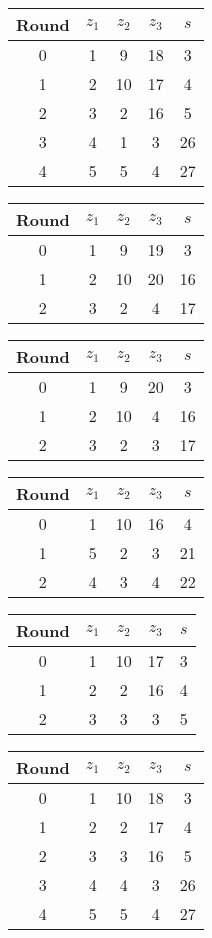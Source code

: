 \begin{multicols}{2}
\begin{tabular}{c | c | c | c | c }
Round & $z_1$ & $z_2$ & $z_3$ & $s$ \\
\hline
0 & 1 & 9 & 18 & 3 \\
1 & 2 & 10 & 17 & 4 \\
2 & 3 & 2 & 16 & 5 \\
3 & 4 & 1 & 3 & 26 \\
4 & 5 & 5 & 4 & 27
\end{tabular}


\begin{tabular}{c | c | c | c | c }
Round & $z_1$ & $z_2$ & $z_3$ & $s$ \\
\hline
0 & 1 & 9 & 19 & 3 \\
1 & 2 & 10 & 20 & 16 \\
2 & 3 & 2 & 4 & 17
\end{tabular}


\begin{tabular}{c | c | c | c | c }
Round & $z_1$ & $z_2$ & $z_3$ & $s$ \\
\hline
0 & 1 & 9 & 20 & 3 \\
1 & 2 & 10 & 4 & 16 \\
2 & 3 & 2 & 3 & 17
\end{tabular}

\begin{tabular}{c | c | c | c | c }
Round & $z_1$ & $z_2$ & $z_3$ & $s$ \\
\hline
0 & 1 & 10 & 16 & 4 \\
1 & 5 & 2 & 3 & 21 \\
2 & 4 & 3 & 4 & 22
\end{tabular}

\begin{tabular}{c | c | c | c | c }
Round & $z_1$ & $z_2$ & $z_3$ & $s$ \\
\hline
0 & 1 & 10 & 17 & 3 \\
1 & 2 & 2 & 16 & 4 \\
2 & 3 & 3 & 3 & 5
\end{tabular}


\begin{tabular}{c | c | c | c | c }
Round & $z_1$ & $z_2$ & $z_3$ & $s$ \\
\hline
0 & 1 & 10 & 18 & 3 \\
1 & 2 & 2 & 17 & 4 \\
2 & 3 & 3 & 16 & 5 \\
3 & 4 & 4 & 3 & 26 \\
4 & 5 & 5 & 4 & 27
\end{tabular}



\end{multicols}
